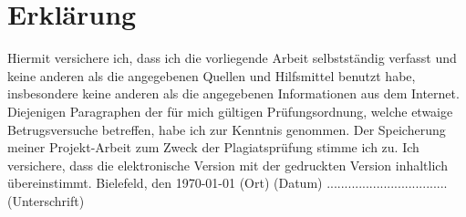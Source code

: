 \documentclass[
        ngerman,
        paper=a4,
        numbers=noendperiod,
]{scrreprt}
\begin{document}
\chapter*{Erklärung}
Hiermit versichere ich, dass ich die vorliegende Arbeit selbstständig verfasst und keine anderen als die angegebenen Quellen und Hilfsmittel benutzt habe, insbesondere keine anderen als die angegebenen Informationen aus dem Internet. Diejenigen Paragraphen der für mich gültigen Prüfungsordnung, welche etwaige Betrugsversuche betreffen, habe ich zur Kenntnis genommen. Der Speicherung meiner Projekt-Arbeit zum Zweck der Plagiatsprüfung stimme ich zu. Ich versichere, dass die elektronische Version mit der gedruckten Version inhaltlich übereinstimmt.\newline
\linebreak
\linebreak
\linebreak
Bielefeld, den \today\newline
(Ort) (Datum)\newline
\linebreak
\linebreak
\linebreak
..................................\newline
(Unterschrift)
\end{document}
